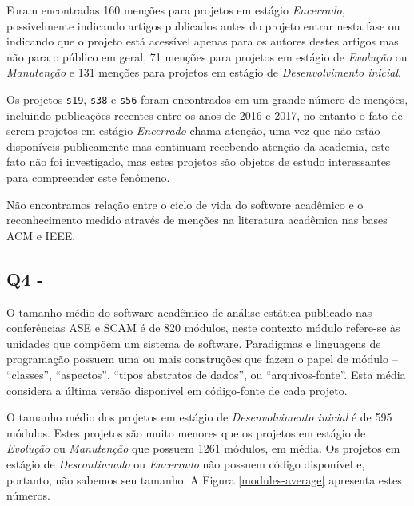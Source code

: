 Foram encontradas 160 menções para projetos em estágio {\it Encerrado},
possivelmente indicando artigos publicados antes do projeto entrar nesta fase ou indicando que o projeto está acessível apenas para os autores destes artigos mas não para o público em geral,
71 menções para projetos em estágio de {\it Evolução} ou {\it Manutenção} e 
131 menções para projetos em estágio de {\it Desenvolvimento inicial}.

Os projetos \texttt{s19}, \texttt{s38} e \texttt{s56} foram encontrados em um
grande número de menções, incluindo publicações recentes entre os anos de 2016
e 2017, no entanto o fato de serem projetos em estágio {\it Encerrado} chama
atenção, uma vez que não estão disponíveis publicamente mas continuam recebendo
atenção da academia, este fato não foi investigado, mas estes projetos são
objetos de estudo interessantes para compreender este fenômeno.

Não encontramos relação entre o ciclo de vida do software acadêmico e o reconhecimento
medido através de menções na literatura acadêmica nas bases ACM e IEEE.

\subsection{Q4 - \QuestaoQuatro} %

O tamanho médio do software acadêmico de análise estática publicado nas
conferências ASE e SCAM é de 820 módulos, neste contexto módulo refere-se às
unidades que compõem um sistema de software.  Paradigmas e linguagens de
programação possuem uma ou mais construções que fazem o papel de módulo --
``classes'', ``aspectos'', ``tipos abstratos de dados'', ou ``arquivos-fonte''.
Esta média considera a última versão disponível em código-fonte de cada projeto.

O tamanho médio dos projetos em estágio de {\it Desenvolvimento inicial} é de 595
módulos. Estes projetos são muito menores que os projetos em estágio de {\it Evolução} 
ou  {\it Manutenção} que possuem 1261 módulos, em média. 
Os projetos em estágio de {\it Descontinuado} ou {\it Encerrado} não possuem código disponível e,
portanto, não sabemos seu tamanho.
A Figura \ref{modules-average} apresenta estes números.

